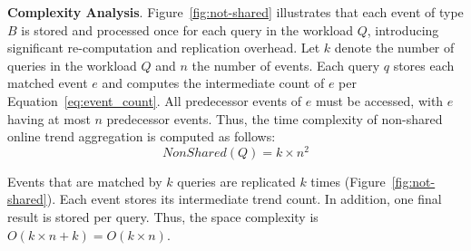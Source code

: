 
\textbf{Complexity Analysis}. 
Figure~\ref{fig:not-shared} illustrates that each event of type $B$ is stored and processed once for each query in the workload $Q$, introducing significant re-computation and replication overhead. 
Let $k$ denote the number of queries in the workload $Q$ and $n$  the number of events. Each query $q$ stores each matched event $e$ and computes the intermediate count of $e$ per Equation~\ref{eq:event_count}. All predecessor events of $e$ must be accessed, with $e$ having at most $n$ predecessor events.  
Thus, the time complexity of non-shared online trend aggregation is computed as follows:
\begin{equation}
\mathit{NonShared}(Q) = k \times n^2
\label{eq:nonshared-cost}
\end{equation}
\vspace{-3mm}

Events that are matched by $k$ queries are replicated $k$ times (Figure~\ref{fig:not-shared}). Each event stores its intermediate trend count. In addition, one final result is stored per query. Thus, the space complexity is $O(k \times n + k) = O(k \times n)$.



